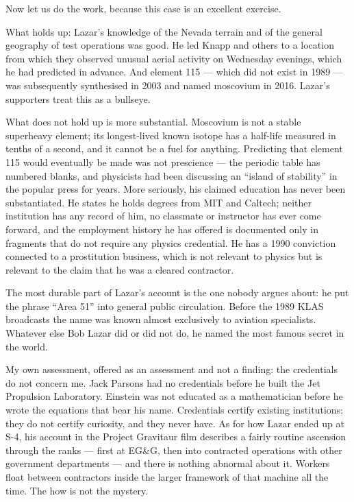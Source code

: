 Now let us do the work, because this case is an excellent exercise.

What holds up: Lazar's knowledge of the Nevada terrain and of the general geography of
test operations was good. He led Knapp and others to a location from which they observed
unusual aerial activity on Wednesday evenings, which he had predicted in advance. And
element 115 --- which did not exist in 1989 --- was subsequently synthesised in 2003 and
named moscovium in 2016. Lazar's supporters treat this as a bullseye.

What does not hold up is more substantial. Moscovium is not a stable superheavy element;
its longest-lived known isotope has a half-life measured in tenths of a second, and it
cannot be a fuel for anything. Predicting that element 115 would eventually be made was
not prescience --- the periodic table has numbered blanks, and physicists had been
discussing an ``island of stability'' in the popular press for years. More seriously, his
claimed education has never been substantiated. He states he holds degrees from MIT and
Caltech; neither institution has any record of him, no classmate or instructor has ever
come forward, and the employment history he has offered is documented only in fragments
that do not require any physics credential. He has a 1990 conviction connected to a
prostitution business, which is not relevant to physics but is relevant to the claim that
he was a cleared contractor.

\begin{funfact}
The most durable part of Lazar's account is the one nobody argues about: he put the phrase
``Area 51'' into general public circulation. Before the 1989 KLAS broadcasts the name was
known almost exclusively to aviation specialists. Whatever else Bob Lazar did or did not
do, he named the most famous secret in the world.
\end{funfact}

My own assessment, offered as an assessment and not a finding: the credentials do not
concern me. Jack Parsons had no credentials before he built the Jet Propulsion Laboratory.
Einstein was not educated as a mathematician before he wrote the equations that bear his name.
Credentials certify existing institutions; they do not certify curiosity, and they never have.
As for how Lazar ended up at S-4, his account in the Project Gravitaur film describes a
fairly routine ascension through the ranks --- first at EG\&G, then into contracted
operations with other government departments --- and there is nothing abnormal about it.
Workers float between contractors inside the larger framework of that machine all the time.
The how is not the mystery.

